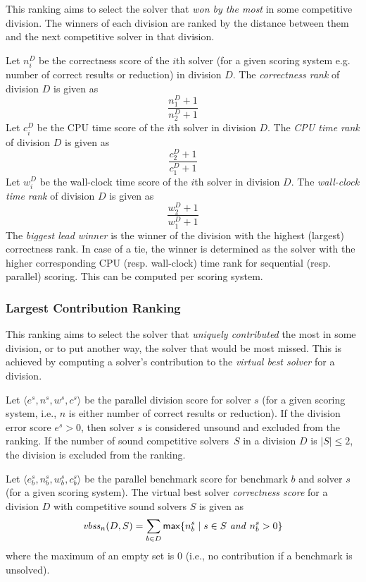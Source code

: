 \documentclass[12pt]{article}
\begin{document}
This ranking aims to select the solver that \emph{won by the most} in some competitive division. The winners of each division are ranked by the distance between them and the next competitive solver in that division.

Let $n_i^D$ be the correctness score of the $i$th solver (for a given scoring
system e.g. number of correct results or reduction) in division $D$.
The \emph{correctness rank} of division $D$ is given as
\[
\frac{n_1^D+1}{n_2^D+1}
\]
Let $c_i^D$ be the CPU time score of the $i$th solver in division $D$.
The \emph{CPU time rank} of division $D$ is given as
\vspace{-1ex}
\[
\frac{c_2^D+1}{c_1^D+1}
\]
Let $w_i^D$ be the wall-clock time score of the $i$th solver in division $D$.
The \emph{wall-clock time rank} of division $D$ is given as
\vspace{-1ex}
\[
\frac{w_2^D+1}{w_1^D+1}
\]
The \emph{biggest lead winner} is the winner of the division with the highest
(largest) correctness rank. In case of a tie, the winner is determined as the
solver with the higher corresponding CPU (resp. wall-clock) time rank for
sequential (resp. parallel) scoring.
This can be computed per scoring system.

\subsubsection{Largest Contribution Ranking}

This ranking aims to select the solver that \emph{uniquely contributed} the most in some division, or to put another way, the solver that would be most missed. This is achieved by computing a solver's contribution to the \emph{virtual best solver} for a division.

Let $\langle e^s, n^s, w^s, c^s \rangle$ be the parallel division score
for solver $s$ (for a given scoring system, i.e., $n$ is either number of correct
results or reduction).
If the division error score $e^s > 0$, then solver $s$ is considered unsound
and excluded from the ranking.
If the number of sound competitive solvers~$S$ in a division $D$ is $|S| \leq 2$,
the division is excluded from the ranking.

Let $\langle e_b^s, n_b^s, w_b^s, c_b^s \rangle$ be the parallel benchmark
score for benchmark $b$ and solver $s$ (for a given scoring system).
The virtual best solver \emph{correctness score} for a division $D$ with
competitive sound solvers $S$ is given as
\[
\mathit{vbss}_n(D,S) = \sum_{b \in D} {\sf max}\{ n_b^s \mid s \in S ~\mathit{and}~ n_b^s > 0 \}
\]
where the maximum of an empty set is 0 (i.e., no contribution if a benchmark
is unsolved).
\end{document}
